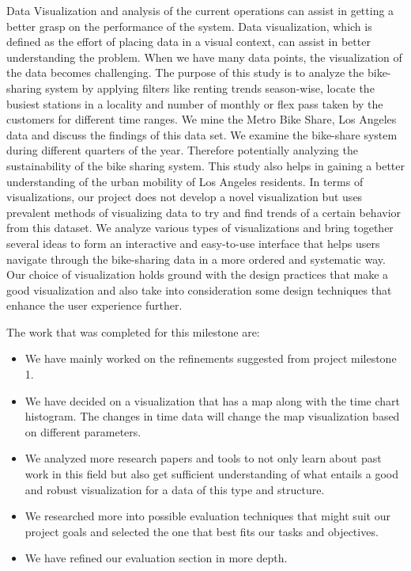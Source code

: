 Data Visualization and analysis of the current operations can assist in getting a better grasp on the performance of the system. Data visualization, which is defined as the effort of placing data in a visual context, can assist in better understanding the problem. When we have many data points, the visualization of the data becomes challenging. The purpose of this study is to analyze the bike-sharing system by applying filters like renting trends season-wise, locate the busiest stations in a locality and number of monthly or flex pass taken by the customers for different time ranges. We mine the Metro Bike Share, Los Angeles data and discuss the findings of this data set. We examine the bike-share system during different quarters of the year. Therefore potentially analyzing the sustainability of the bike sharing system. This study also helps in gaining a better understanding of the urban mobility of Los Angeles residents. In terms of visualizations, our project does not develop a novel visualization but uses prevalent methods of visualizing data to try and find trends of a certain behavior from this dataset. We analyze various types of visualizations and bring together several ideas to form an interactive and easy-to-use interface that helps users navigate through the bike-sharing data in a more ordered and systematic way. Our choice of visualization holds ground with the design practices that make a good visualization and also take into consideration some design techniques that enhance the user experience further.

The work that was completed for this milestone are:
\begin{itemize}
  \item We have mainly worked on the refinements suggested from project milestone 1.
  \item We have decided on a visualization that has a map along with the time chart histogram. The changes in time data will change the map visualization based on different parameters. 
  \item We analyzed more research papers and tools to not only learn about past work in this field but also get sufficient understanding of what entails a good and robust visualization for a data of this type and structure.
  \item We researched more into possible evaluation techniques that might suit our project goals and selected the one that best fits our tasks and objectives.
  \item We have refined our evaluation section in more depth.
\end{itemize}
